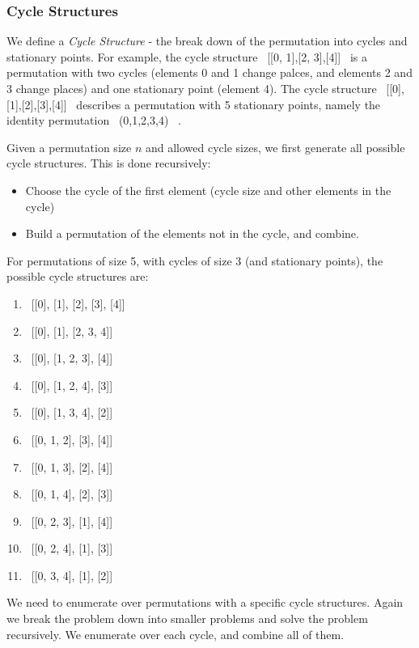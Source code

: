 \documentclass[]{article}
\begin{document}
\subsubsection{Cycle Structures}
We define a \emph{Cycle Structure} - the break down of the permutation into cycles and stationary points. For example, the cycle structure ~[[0, 1],[2, 3],[4]]~ is a permutation with two cycles (elements 0 and 1 change palces, and elements 2 and 3 change places) and one stationary point (element 4). The cycle structure ~[[0],[1],[2],[3],[4]]~ describes a permutation with 5 stationary points, namely the identity permutation ~(0,1,2,3,4)~ .

Given a permutation size $n$ and allowed cycle sizes, we first generate all possible cycle structures. This is done recursively:
\begin{itemize}
	\item Choose the cycle of the first element (cycle size and other elements in the cycle)
	\item Build a permutation of the elements not in the cycle, and combine.
\end{itemize}

For permutations of size 5, with cycles of size 3 (and stationary points), the possible cycle structures are:

\begin{multicols}{2}
\begin{enumerate}
	\item ~[[0], [1], [2], [3], [4]]~
	\item ~[[0], [1], [2, 3, 4]]~
	\item ~[[0], [1, 2, 3], [4]]~
	\item ~[[0], [1, 2, 4], [3]]~
	\item ~[[0], [1, 3, 4], [2]]~
	\item ~[[0, 1, 2], [3], [4]]~
	\item ~[[0, 1, 3], [2], [4]]~
	\item ~[[0, 1, 4], [2], [3]]~
	\item ~[[0, 2, 3], [1], [4]]~
	\item ~[[0, 2, 4], [1], [3]]~
	\item ~[[0, 3, 4], [1], [2]]~
\end{enumerate}
\end{multicols}

We need to enumerate over permutations with a specific cycle structures. Again we break the problem down into smaller problems and solve the problem recursively. We enumerate over each cycle, and combine all of them.
\end{document}
